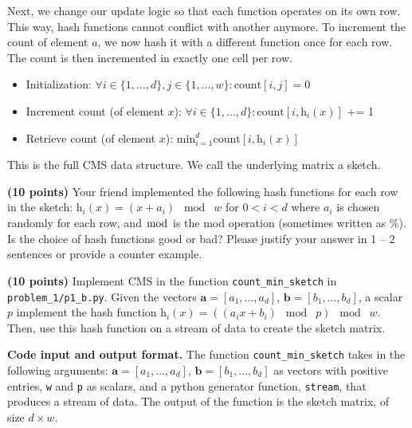 \documentclass{hw}
\newcommand{\io}{\textbf{Code input and output format.} }
\begin{document}
\begin{problem}
Next, we change our update logic so that each function operates on its own row. This way, hash functions cannot conflict with another anymore. To increment the count of element $a$, we now hash it with a different function once for each row. The count is then incremented in exactly one cell per row.
\begin{itemize}
    \item Initialization: $\forall i \in \{1, \dots, d\}, j \in \{1, \dots, w\}:\text{count}[i, j] = 0$ 
    \item Increment count (of element $x$):  $\forall i \in \{1, \dots, d\}:\text{count}[i,\text{h}_i(x)]$ += 1
    \item Retrieve count (of element $x$): $\text{min}_{i=1}^d \text{count}[i, \text{h}_i(x)]$
\end{itemize}


This is the full CMS data structure. We call the underlying matrix a sketch.



\begin{subproblem}
\textbf{(10 points)} Your friend implemented the following hash functions for each row in the sketch: h$_i(x) = (x + a_i) \; \bmod \; w$ for $0 < i < d$ where $a_i$ is chosen randomly for each row, and $\bmod$ is the mod operation (sometimes written as $\%$). Is the choice of hash functions good or bad? Please justify your answer in 1 -- 2 sentences or provide a counter example.
\end{subproblem}

\begin{subproblem}
\textbf{(10 points)} Implement CMS in the function \texttt{count\_min\_sketch} in \texttt{problem\_1/p1\_b.py}. Given the vectors 
$\mathbf{a} = [a_1, \dots, a_d]$, $\mathbf{b} = [b_1, \dots, b_d]$, a scalar $p$ implement the hash function h$_i(x) = ((a_ix + b_i) \; \bmod \; p) \; \bmod \; w$. Then, use this hash function on a stream of data to create the sketch matrix.

\io The function  \texttt{count\_min\_sketch} takes in the following arguments: $\mathbf{a} = [a_1, \dots, a_d]$, $\mathbf{b} = [b_1, \dots, b_d]$ as vectors with positive entries, \texttt{w} and \texttt{p} as scalars, and a python generator function, \texttt{stream}, that produces a stream of data. The output of the function is the sketch matrix, of size $d \times w$.


\end{subproblem}
\end{problem}
\end{document}
